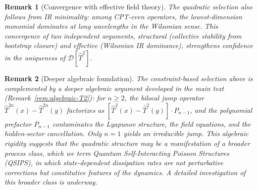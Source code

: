 \documentclass[12pt,a4paper]{article}
\newtheorem{remark}{Remark}[section]
\numberwithin{equation}{section}
\begin{document}
\begin{remark}[Convergence with effective field theory]
The quadratic selection also follows from IR minimality: among CPT-even operators, the lowest-dimension monomial dominates at long wavelengths in the Wilsonian sense. This convergence of two independent arguments, structural (collective stability from bootstrap closure) and effective (Wilsonian IR dominance), strengthens confidence in the uniqueness of $\mathcal{D}[\hat T^2]$.
\end{remark}

\begin{remark}[Deeper algebraic foundation]
The constraint-based selection above is complemented by a deeper algebraic argument developed in the main text (Remark~\ref{rem:algebraic-T2}): for $n \ge 2$, the bilocal jump operator $\hat T^{2n}(x) - \hat T^{2n}(y)$ factorizes as $[\hat T^2(x) - \hat T^2(y)] \cdot P_{n-1}$, and the polynomial prefactor $P_{n-1}$ contaminates the Lyapunov structure, the field equations, and the hidden-sector cancellation. Only $n = 1$ yields an \emph{irreducible} jump. This algebraic rigidity suggests that the quadratic structure may be a manifestation of a broader process class, which we term Quantum Self-Interacting Poisson Structures (QSIPS), in which state-dependent dissipation rates are not perturbative corrections but constitutive features of the dynamics. A detailed investigation of this broader class is underway.
\end{remark}

\endgroup
\end{document}
